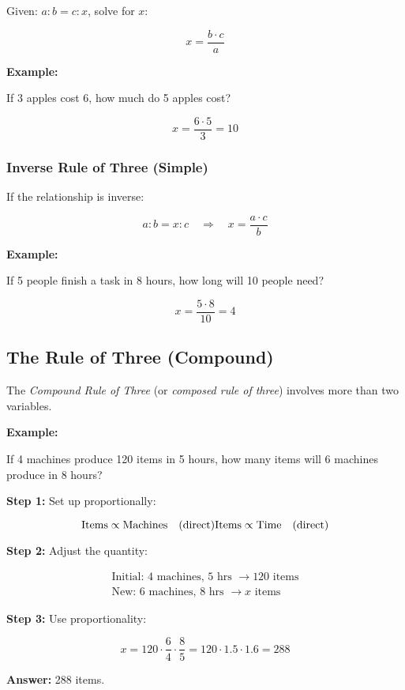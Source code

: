 Given: \(a : b = c : x\), solve for \(x\):

\[
    x = \frac{b \cdot c}{a}
\]

\textbf{Example:}

If 3 apples cost 6, how much do 5 apples cost?

\[
    x = \frac{6 \cdot 5}{3} = 10
\]

\subsubsection{Inverse Rule of Three (Simple)}

If the relationship is inverse:

\[
    a : b = x : c \quad \Rightarrow \quad x = \frac{a \cdot c}{b}
\]

\textbf{Example:}

If 5 people finish a task in 8 hours, how long will 10 people need?

\[
    x = \frac{5 \cdot 8}{10} = 4
\]

\subsection{The Rule of Three (Compound)}

The \emph{Compound Rule of Three} (or \emph{composed rule of three}) involves more than two variables.

\textbf{Example:}

If 4 machines produce 120 items in 5 hours, how many items will 6 machines produce in 8 hours?

\textbf{Step 1:} Set up proportionally:

\[
    \text{Items} \propto \text{Machines} \quad (\text{direct}) \\
    \text{Items} \propto \text{Time} \quad (\text{direct})
\]

\textbf{Step 2:} Adjust the quantity:

\begin{align*}
    \text{Initial: } 4 \text{ machines, } 5 \text{ hrs } \rightarrow 120 \text{ items} \\
    \text{New: } 6 \text{ machines, } 8 \text{ hrs } \rightarrow x \text{ items}
\end{align*}

\textbf{Step 3:} Use proportionality:

\[
    x = 120 \cdot \frac{6}{4} \cdot \frac{8}{5} = 120 \cdot 1.5 \cdot 1.6 = 288
\]

\textbf{Answer:} 288 items.

